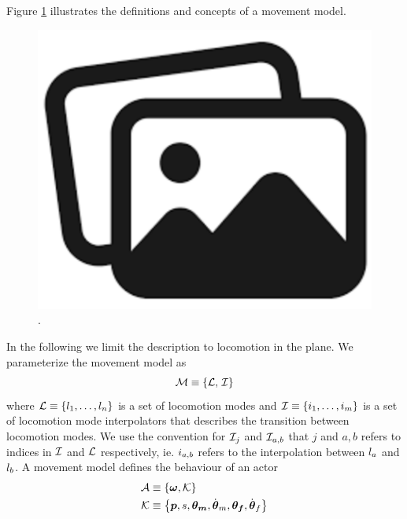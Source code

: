 Figure \ref{fig:movement:model} illustrates the definitions and concepts of a movement model.
\begin{figure}
    \centering
    \includegraphics[width=0.75\columnwidth]{img/temporary.png}
    \caption{.}
    \label{fig:movement:model}
\end{figure}
In the following we limit  the description to locomotion in the plane. We parameterize the movement model as 
\begin{equation}
    \label{eq:model:parameterization}
 \mathcal{M} \equiv 
 \left\{ \mathcal{L},\,\mathcal{I} \right\}
\end{equation}
where $\mathcal{L} \equiv \left\{  l_1, \ldots, l_n \right\}$ is a set of locomotion modes and $\mathcal{I} \equiv \left\{  i_1, \ldots, i_m \right\}$ is a set of locomotion mode interpolators that describes the transition between locomotion modes. We use the convention for $\mathcal{I}_j$ and $\mathcal{I}_{a,b}$ that $j$ and $a,b$ refers to indices in $\mathcal{I}$ and $\mathcal{L}$ respectively, ie. $i_{a,b}$ refers to the interpolation between $l_a$ and $l_b$. A movement model defines the behaviour of an actor 
\begin{subequations}
\begin{align}
    \label{eq:actor:def}
    \mathcal{A} 
    &\equiv
    \left\{ 
        \boldsymbol{\omega }, \mathcal{K} 
         \right\}\\
    \mathcal{K}
    &\equiv
    \left\{ 
        \boldsymbol{p }, s, \boldsymbol{\theta_m }, \dot{\boldsymbol{\theta }}_m, {\boldsymbol{\theta_f }}, \dot{\boldsymbol{\theta }}_f 
         \right\}
\end{align}
\end{subequations}
